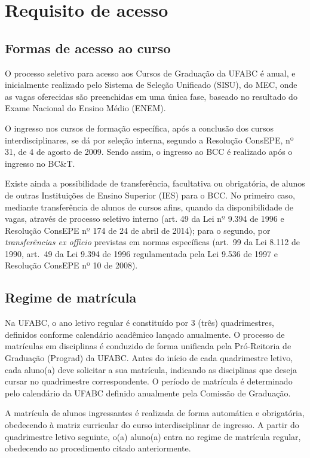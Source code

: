 \section{Requisito de acesso}
\label{sec:acesso}

\subsection{Formas de acesso ao curso}

O processo seletivo para acesso aos Cursos de Graduação da UFABC é anual, e
inicialmente realizado pelo Sistema de Seleção Unificado (SISU), do MEC, onde
as vagas oferecidas são preenchidas em uma única fase, baseado no resultado
do Exame Nacional do Ensino Médio (ENEM).

O ingresso nos cursos de formação específica, após a conclusão dos cursos
interdisciplinares, se dá por seleção interna, segundo a Resolução ConsEPE, nº
31, de 4 de agosto de 2009.
Sendo assim, o ingresso ao BCC é realizado após o ingresso no BC\&T.

Existe ainda a possibilidade de transferência, facultativa ou obrigatória, de
alunos de outras Instituições de Ensino Superior (IES) para o BCC.
No primeiro caso, mediante transferência de alunos de cursos afins, quando da
disponibilidade de vagas, através de processo seletivo interno (art. 49 da Lei
nº 9.394 de 1996 e Resolução ConsEPE nº 174 de 24 de abril de 2014); para o
segundo, por \textit{transferências ex officio} previstas em normas específicas
(art.\ 99 da Lei 8.112 de 1990, art.\ 49 da Lei 9.394 de 1996 regulamentada
pela Lei 9.536 de 1997 e Resolução ConsEPE nº 10 de 2008).

\subsection{Regime de matrícula}

Na UFABC, o ano letivo regular é constituído por 3 (três) quadrimestres,
definidos conforme calendário acadêmico lançado anualmente.
O processo de matrículas em disciplinas é conduzido de forma unificada pela
Pró-Reitoria de Graduação (Prograd) da UFABC.
Antes do início de cada quadrimestre letivo, cada aluno(a) deve solicitar a sua
matrícula, indicando as disciplinas que deseja cursar no quadrimestre
correspondente.
O período de matrícula é determinado pelo calendário da UFABC definido
anualmente pela Comissão de Graduação.

A matrícula de alunos ingressantes é realizada de forma automática e
obrigatória, obedecendo à matriz curricular do curso interdisciplinar de
ingresso.
A partir do quadrimestre letivo seguinte, o(a) aluno(a) entra no regime de
matrícula regular, obedecendo ao procedimento citado anteriormente.

